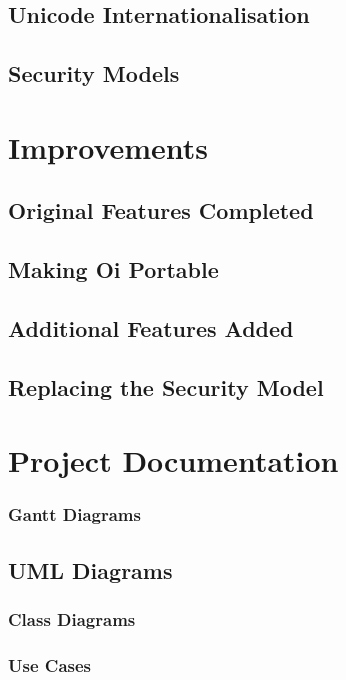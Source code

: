 \documentclass[a4paper,12pt]{article}
\begin{document}
\subsection{Unicode Internationalisation}

\subsection{Security Models}


\section{Improvements}


\subsection{Original Features Completed}

\subsection{Making Oi Portable}

\subsection{Additional Features Added}

\subsection{Replacing the Security Model}


\section{Project Documentation}


\subsubsection{Gantt Diagrams}

\subsection{UML Diagrams}

\subsubsection{Class Diagrams}

\subsubsection{Use Cases}
\end{document}
